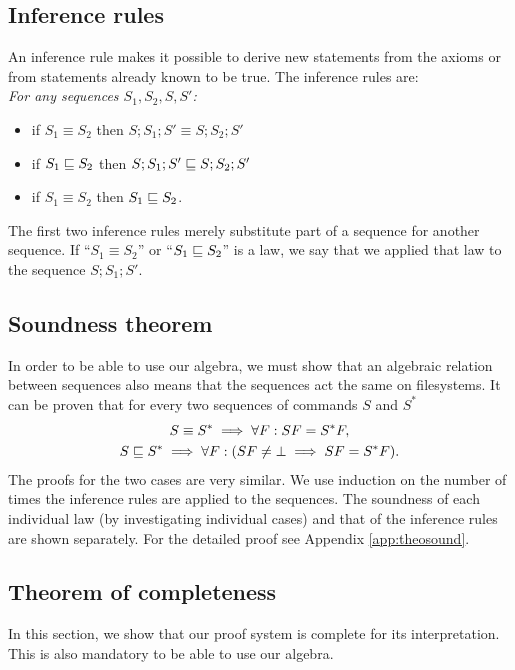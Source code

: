 \begin{table}[H]
\subsection{Inference rules}

An inference rule makes it possible to derive new statements from 
the axioms or from statements already known to be true. 
The inference rules are:\\
\emph{For any sequences \(S_1, S_2, S, S'\):}
\begin{itemize}
\item if \(S_1\equiv S_2\) then \(S;S_1;S'\equiv S;S_2;S'\)
\item if \(S_1\sqsubseteq S_2\) then \(S;S_1;S'\sqsubseteq S;S_2;S'\)
\item if \(S_1\equiv S_2\) then \(S_1\sqsubseteq S_2\).
\end{itemize}
The first two inference rules merely substitute part of a sequence for
another sequence.
If ``\(S_1\equiv S_2\)'' or 
``\(S_1\sqsubseteq S_2\)'' is a law, we say that we applied that law to
the sequence \(S;S_1;S'\).

\subsection{Soundness theorem}
\label{theorem:soundness}
In order to be able to use our algebra,
we must show that an algebraic relation between sequences also means
that the sequences act the same on filesystems.
%
It can be proven that for every two sequences of commands
\(S\) and \(S^*\) 
\begin{gather*}
S\equiv S^* \implies \forall F: SF=S^*F,\\
S\sqsubseteq S^* \implies \forall F: (SF\ne\bot \implies SF=S^*F).
\end{gather*}
The proofs for the two cases are very similar. We use induction on the
number of times the inference rules are applied to the sequences.
The soundness of each individual law
(by investigating individual cases)
and that of the inference rules are shown separately.
For the detailed proof see Appendix \ref{app:theosound}.

\medskip{}

\subsection{Theorem of completeness}
\label{theorem:completeness}
In this section, we show that our proof system is complete for its
interpretation. This is also mandatory to be able to use our algebra.


\end{table}
